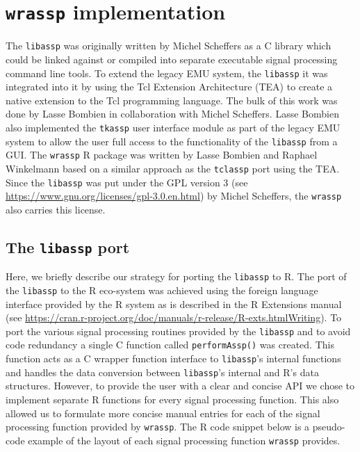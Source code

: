 \documentclass[]{book}
\begin{document}
\hypertarget{chap:wrassp_impl}{%
\chapter{\texorpdfstring{\texttt{wrassp} implementation}{wrassp implementation}}\label{chap:wrassp_impl}}

The \texttt{libassp} was originally written by Michel Scheffers as a C library which could be linked against or compiled into separate executable signal processing command line tools. To extend the legacy EMU system, the \texttt{libassp} it was integrated into it by using the Tcl Extension Architecture (TEA) to create a native extension to the Tcl programming language. The bulk of this work was done by Lasse Bombien in collaboration with Michel Scheffers. Lasse Bombien also implemented the \texttt{tkassp} user interface module as part of the legacy EMU system to allow the user full access to the functionality of the \texttt{libassp} from a GUI. The \texttt{wrassp} R package was written by Lasse Bombien and Raphael Winkelmann based on a similar approach as the \texttt{tclassp} port using the TEA. Since the \texttt{libassp} was put under the GPL version 3 (see \url{https://www.gnu.org/licenses/gpl-3.0.en.html}) by Michel Scheffers, the \texttt{wrassp} also carries this license.

\hypertarget{the-libassp-port}{%
\section{\texorpdfstring{The \texttt{libassp} port}{The libassp port}}\label{the-libassp-port}}

Here, we briefly describe our strategy for porting the \texttt{libassp} to R. The port of the \texttt{libassp} to the R eco-system was achieved using the foreign language interface provided by the R system as is described in the R Extensions manual (see \url{https://cran.r-project.org/doc/manuals/r-release/R-exts.htmlWriting}). To port the various signal processing routines provided by the \texttt{libassp} and to avoid code redundancy a single C function called \texttt{performAssp()} was created. This function acts as a C wrapper function interface to \texttt{libassp}'s internal functions and handles the data conversion between \texttt{libassp}'s internal and R's data structures. However, to provide the user with a clear and concise API we chose to implement separate R functions for every signal processing function. This also allowed us to formulate more concise manual entries for each of the signal processing function provided by \texttt{wrassp}. The R code snippet below is a pseudo-code example of the layout of each signal processing function \texttt{wrassp} provides.
\end{document}
